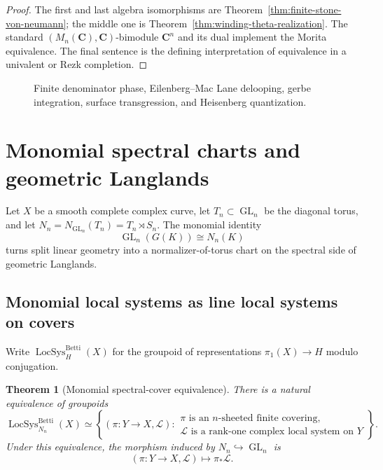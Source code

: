 \documentclass[11pt]{amsart}
\numberwithin{equation}{section}
\newtheorem{theorem}{Theorem}[section]
\theoremstyle{definition}
\newcommand{\Z}{\mathbf Z}
\newcommand{\Q}{\mathbf Q}
\newcommand{\C}{\mathbf C}
\newcommand{\End}{\operatorname{End}}
\newcommand{\GL}{\operatorname{GL}}
\newcommand{\LocSys}{\operatorname{LocSys}}
\begin{document}
\begin{proof}
The first and last algebra isomorphisms are
Theorem~\ref{thm:finite-stone-von-neumann}; the middle one is
Theorem~\ref{thm:winding-theta-realization}.  The standard
$(M_n(\C),\C)$-bimodule $\C^n$ and its dual implement the Morita
equivalence.  The final sentence is the defining interpretation of
equivalence in a univalent or Rezk completion.
\end{proof}

\begin{figure}[htbp]
\centering
{}
\caption{Finite denominator phase, Eilenberg--Mac Lane delooping,
gerbe integration, surface transgression, and Heisenberg quantization.}
\label{fig:phase-gerbe-quantization}
\end{figure}


\section{Monomial spectral charts and geometric Langlands}
\label{sec:monomial-langlands}

Let $X$ be a smooth complete complex curve, let
$T_n\subset\GL_n$ be the diagonal torus, and let
$N_n=N_{\GL_n}(T_n)=T_n\rtimes S_n$.  The monomial identity
\[
\GL_n(G(K))\cong N_n(K)
\]
turns split linear geometry into a normalizer-of-torus chart on the spectral
side of geometric Langlands.

\subsection{Monomial local systems as line local systems on covers}

Write $\LocSys_H^{\mathrm{Betti}}(X)$ for the groupoid of representations
$\pi_1(X)\to H$ modulo conjugation.

\begin{theorem}[Monomial spectral-cover equivalence]
\label{thm:monomial-spectral-cover}
There is a natural equivalence of groupoids
\[
\LocSys_{N_n}^{\mathrm{Betti}}(X)
\simeq
\left\{
(\pi:Y\to X,\mathcal L):
\begin{array}{l}
\pi\text{ is an }n\text{-sheeted finite covering},\\
\mathcal L\text{ is a rank-one complex local system on }Y
\end{array}
\right\}.
\]
Under this equivalence, the morphism induced by
$N_n\hookrightarrow\GL_n$ is
\[
(\pi:Y\to X,\mathcal L)\longmapsto\pi_*\mathcal L.
\]
\end{theorem}
\end{document}
